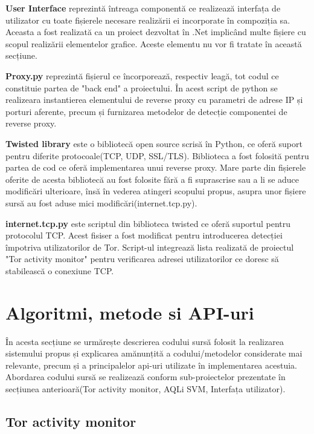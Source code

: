 \textbf{User Interface}  reprezintă întreaga componentă ce realizează interfața de utilizator cu toate fișierele necesare realizării ei incorporate în compoziția sa. Aceasta a fost realizată ca un proiect dezvoltat în .Net implicând multe fișiere cu scopul realizării elementelor grafice. Aceste elementu nu vor fi tratate în această secțiune. 

\textbf{Proxy.py}  reprezintă fișierul ce încorporează, respectiv leagă, tot codul ce constituie partea de "back end" a proiectului. În acest script de python se realizeara instantierea elementului de reverse proxy cu parametri de adrese IP și porturi aferente, precum și furnizarea metodelor de detecție componentei de reverse proxy. 

\textbf{Twisted library}  este o bibliotecă open source scrisă în Python, ce oferă suport pentru diferite protocoale(TCP, UDP, SSL/TLS). Biblioteca a fost folosită pentru partea de cod ce oferă implementarea unui reverse proxy. Mare parte din fișierele oferite de acesta bibliotecă au fost folosite fără a fi suprascrise sau a li se aduce modificări ulterioare, însă în vederea atingeri scopului propus, asupra unor fișiere sursă au fost aduse mici modificări(internet.tcp.py).

\textbf{internet.tcp.py} este scriptul din biblioteca twisted ce oferă suportul pentru protocolul TCP. Acest fisiser a fost modificat pentru introducerea detecției împotriva utilizatorilor de Tor. Script-ul integrează lista realizată de proiectul "Tor activity monitor" pentru verificarea adresei utilizatorilor ce doresc să stabilească o conexiune TCP. 




\section{Algoritmi, metode si API-uri}

În acesta secțiune se urmărește descrierea codului sursă folosit la realizarea sistemului propus și explicarea amănunțită a codului/metodelor considerate mai relevante, precum și a principalelor api-uri utilizate în implementarea acestuia. Abordarea codului sursă se realizează conform sub-proiectelor prezentate în secțiunea anterioară(Tor activity monitor, AQLi SVM, Interfața utilizator). 

\subsection{Tor activity monitor}

